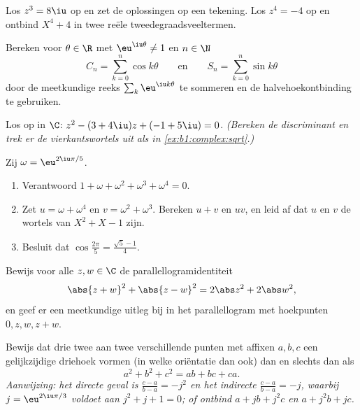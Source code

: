 \begin{exercise}[$\star$]\label{exo:b1:complex:5}
Los $z^3 = 8\iu$ op en zet de oplossingen op een tekening. Los $z^4 =
-4$ op en ontbind $X^4 + 4$ in twee reële tweedegraadsveeltermen.
\end{exercise}

\begin{exercise}[$\star\star$]\label{exo:b1:complex:6}
Bereken voor $\theta \in \R$ met $\eu^{\iu\theta} \neq 1$ en $n \in \N$
\[
C_n = \sum_{k=0}^{n} \cos k\theta
\qquad\text{en}\qquad
S_n = \sum_{k=0}^{n} \sin k\theta
\]
door de meetkundige reeks $\sum_k \eu^{\iu k\theta}$ te sommeren en de
halvehoekontbinding te gebruiken.
\end{exercise}

\begin{exercise}[$\star\star$]\label{exo:b1:complex:7}
Los op in $\C$: $z^2 - (3 + 4\iu) z + (-1 + 5\iu) = 0$. \emph{(Bereken
de discriminant en trek er de vierkantswortels uit als in
\cref{ex:b1:complex:sqrt}.)}
\end{exercise}

\begin{exercise}[$\star\star$]\label{exo:b1:complex:8}
Zij $\omega = \eu^{2\iu\pi/5}$.
\begin{enumerate}
  \item Verantwoord $1 + \omega + \omega^2 + \omega^3 + \omega^4 = 0$.
  \item Zet $u = \omega + \omega^4$ en $v = \omega^2 + \omega^3$.
        Bereken $u + v$ en $uv$, en leid af dat $u$ en $v$ de wortels
        van $X^2 + X - 1$ zijn.
  \item Besluit dat $\cos\frac{2\pi}{5} = \frac{\sqrt 5 - 1}{4}$.
\end{enumerate}
\end{exercise}

\begin{exercise}[$\star\star$]\label{exo:b1:complex:9}
Bewijs voor alle $z, w \in \C$ de parallellogramidentiteit
\[
\abs{z + w}^2 + \abs{z - w}^2 = 2\abs z^2 + 2\abs w^2 ,
\]
en geef er een meetkundige uitleg bij in het parallellogram met
hoekpunten $0, z, w, z + w$.
\end{exercise}

\begin{exercise}[$\star\star\star$]\label{exo:b1:complex:10}
Bewijs dat drie twee aan twee verschillende punten met affixen $a, b, c$
een gelijkzijdige driehoek vormen (in welke oriëntatie dan ook) dan en
slechts dan als
\[
a^2 + b^2 + c^2 = ab + bc + ca .
\]
\emph{Aanwijzing: het directe geval is $\frac{c-a}{b-a} = -j^2$ en het
indirecte $\frac{c-a}{b-a} = -j$, waarbij $j = \eu^{2\iu\pi/3}$ voldoet
aan $j^2 + j + 1 = 0$; of ontbind $a + jb + j^2c$ en $a + j^2 b + jc$.}
\end{exercise}

